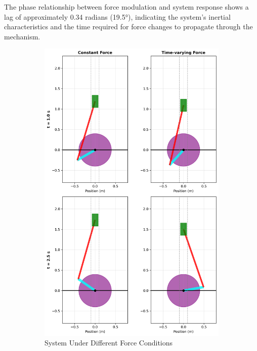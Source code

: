 \documentclass[10pt]{article}
\begin{document}
The phase relationship between force modulation and system response shows a lag of approximately 0.34 radians (19.5°), indicating the system's inertial characteristics and the time required for force changes to propagate through the mechanism.
\begin{figure}[H]
    \centering
    \begin{subfigure}[b]{0.45\textwidth}
        \centering
        \includegraphics[width=\textwidth]{system_force_comparison.png}
        \caption{System Under Different Force Conditions}
    \end{subfigure}
    \hfill
    \begin{subfigure}[b]{0.45\textwidth}

\end{subfigure}
\end{figure}
\end{document}
